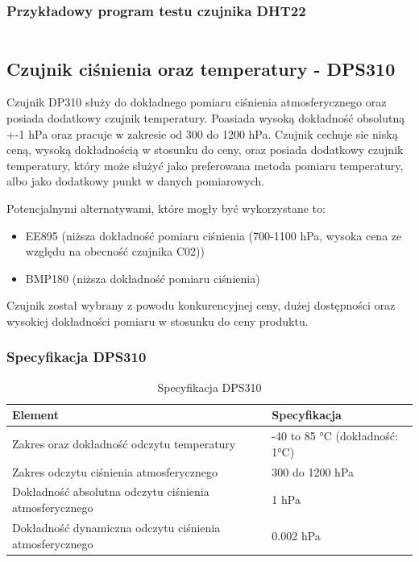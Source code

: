 \documentclass[12pt,a4paper]{article}
\begin{document}
\subsubsection{Przykładowy program testu czujnika DHT22}

\begin{code}[H]
\inputminted[frame=lines,baselinestretch=1,breaklines,linenos,xleftmargin=1.5em]{c}{../proj/dht22-test/dht22-test.ino}

\caption{Test czujnika DHT22}
\end{code}

\subsection{Czujnik ciśnienia oraz temperatury - DPS310}

Czujnik DP310 służy do dokładnego pomiaru ciśnienia atmosferycznego oraz posiada dodatkowy czujnik temperatury. Poasiada wysoką dokładność obsolutną +-1 hPa oraz 
pracuje w zakresie od 300 do 1200 hPa. Czujnik cechuje sie niską ceną, wysoką dokładnością w stosunku do ceny, oraz posiada dodatkowy czujnik temperatury, który może 
służyć jako preferowana metoda pomiaru temperatury, albo jako dodatkowy punkt w danych pomiarowych.

Potencjalnymi alternatywami, które mogły być wykorzystane to:
\begin{itemize}
    \item EE895 (niższa dokładność pomiaru ciśnienia (700-1100 hPa, wysoka cena ze względu na obecność czujnika C02))
    \item BMP180 (niższa dokładność pomiaru ciśnienia)
\end{itemize}

Czujnik został wybrany z powodu konkurencyjnej ceny, dużej dostępności oraz wysokiej dokładności pomiaru w stosunku do ceny produktu.

\subsubsection{Specyfikacja DPS310}

\begin{table}[H]
    \centering
    \begin{tabular}{|l|l|}
        \hline
        Element & Specyfikacja \\
        \hline
        Zakres oraz dokładność odczytu temperatury & -40 to 85 °C (dokładność: 1°C) \\
        \hline
        Zakres odczytu ciśnienia atmosferycznego & 300 do 1200 hPa \\
        \hline
        Dokładność absolutna odczytu ciśnienia atmosferycznego & 1 hPa \\
        \hline
        Dokładność dynamiczna odczytu ciśnienia atmosferycznego & 0.002 hPa \\
        \hline
    \end{tabular}
    \caption{Specyfikacja DPS310}
    \label{dps310-spec}
\end{table}
\end{document}
